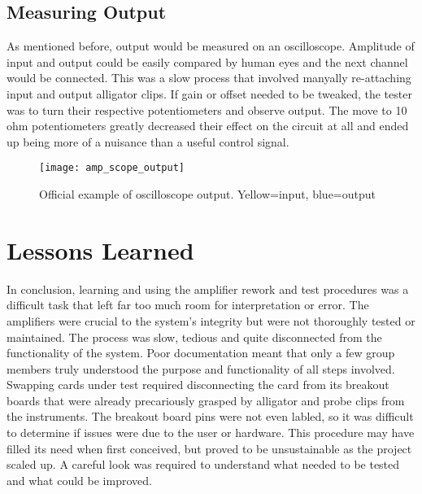 \subsection{Measuring Output}
As mentioned before, output would be measured on an oscilloscope. Amplitude of input and output could be easily compared by human eyes and the next channel would be connected. This was a slow process that involved manyally re-attaching input and output alligator clips. If gain or offset needed to be tweaked, the tester was to turn their respective potentiometers and observe output. The move to 10 ohm potentiometers greatly decreased their effect on the circuit at all and ended up being more of a nuisance than a useful control signal.
\begin{figure}[!htb]
	\centering
	\texttt{[image: amp\_scope\_output]}
	\caption{Official example of oscilloscope output. Yellow=input, blue=output}
\end{figure}
\section{Lessons Learned}
In conclusion, learning and using the amplifier rework and test procedures was a difficult task that left far too much room for interpretation or error. The amplifiers were crucial to the system's integrity but were not thoroughly tested or maintained. The process was slow, tedious and quite disconnected from the functionality of the system. Poor documentation meant that only a few group members truly understood the purpose and functionality of all steps involved. Swapping cards under test required disconnecting the card from its breakout boards that were already precariously grasped by alligator and probe clips from the instruments. The breakout board pins were not even labled, so it was difficult to determine if issues were due to the user or hardware. This procedure may have filled its need when first conceived, but proved to be unsustainable as the project scaled up. A careful look was required to understand what needed to be tested and what could be improved.

